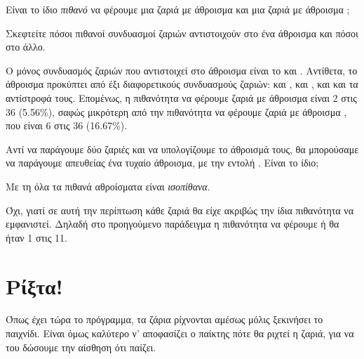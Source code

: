 \documentclass[a4paper,11pt,oneside]{book}
\begin{document}
\begin{step}
Είναι το ίδιο \emph{πιθανό} να φέρουμε μια ζαριά με άθροισμα  και μια ζαριά με άθροισμα ;

\begin{note}
Σκεφτείτε πόσοι πιθανοί συνδυασμοί ζαριών αντιστοιχούν στο ένα άθροισμα και πόσοι στο άλλο.
\end{note}

\begin{answer}
Ο μόνος συνδυασμός ζαριών που αντιστοιχεί στο άθροισμα  είναι το  και . Αντίθετα, το άθροισμα  προκύπτει από έξι διαφορετικούς συνδυασμούς ζαριών:  και ,  και ,  και  και τα αντίστροφά τους. Επομένως, η πιθανότητα να φέρουμε ζαριά με άθροισμα  είναι 2 στις 36 (5.56\%), σαφώς μικρότερη από την πιθανότητα να φέρουμε ζαριά με άθροισμα , που είναι 6 στις 36 (16.67\%).
\end{answer}

Αντί να παράγουμε δύο ζαριές και να υπολογίζουμε το άθροισμά τους, θα μπορούσαμε να παράγουμε απευθείας ένα τυχαίο άθροισμα, με την εντολή . Είναι το ίδιο;

\begin{note}
Με τη  όλα τα πιθανά αθροίσματα είναι \emph{ισοπίθανα}.
\end{note}

\begin{answer}
Όχι, γιατί σε αυτή την περίπτωση κάθε ζαριά θα είχε ακριβώς την ίδια πιθανότητα να εμφανιστεί. Δηλαδή στο προηγούμενο παράδειγμα η πιθανότητα να φέρουμε  ή  θα ήταν 1 στις 11.
\end{answer}
\end{step}

\section{Ρίξτα!}

Όπως έχει τώρα το πρόγραμμα, τα ζάρια ρίχνονται αμέσως μόλις ξεκινήσει το παιχνίδι. Είναι όμως καλύτερο ν' αποφασίζει ο παίκτης πότε θα ριχτεί η ζαριά, για να του δώσουμε την αίσθηση ότι παίζει.
\end{document}
